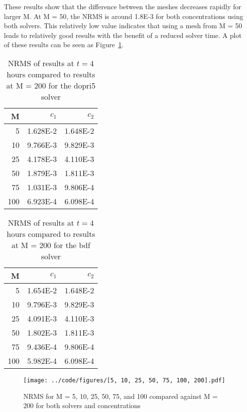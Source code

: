 \documentclass[twocolumn,10pt]{asme2ej}
\begin{document}
These results show that the difference between the meshes decreases rapidly for larger M. At M = 50, the NRMS is around 1.8E-3 for both concentrations using both solvers. This relatively low value indicates that using a mesh from M = 50 leads to relatively good results with the benefit of a reduced solver time. A plot of these results can be seen as Figure~\ref{NRMS_plot}.


\begin{table}[tb]
\begin{center}
\begin{tabular}{| r | r r |}
\hline
M & $c_{1}$ & $c_{2}$ \\
\hline
  5 & 1.628E-2 & 1.648E-2 \\
 10 & 9.766E-3 & 9.829E-3 \\
 25 & 4.178E-3 & 4.110E-3 \\
 50 & 1.879E-3 & 1.811E-3 \\
 75 & 1.031E-3 & 9.806E-4 \\
100 & 6.923E-4 & 6.098E-4 \\
\hline
\end{tabular}
\caption{NRMS of results at $t=4$ hours compared to results at M = 200 for the dopri5 solver}
\label{dopri5_nrms_table}
\end{center}
\end{table}

\begin{table}[tb]
\begin{center}
\begin{tabular}{| r | r r |}
\hline
M & $c_{1}$ & $c_{2}$ \\
\hline
  5 & 1.654E-2 & 1.648E-2 \\
 10 & 9.796E-3 & 9.829E-3 \\
 25 & 4.091E-3 & 4.110E-3 \\
 50 & 1.802E-3 & 1.811E-3 \\
 75 & 9.436E-4 & 9.806E-4 \\
100 & 5.982E-4 & 6.098E-4 \\
\hline
\end{tabular}
\caption{NRMS of results at $t=4$ hours compared to results at M = 200 for the bdf solver}
\label{bdf_nrms_table}
\end{center}
\end{table}

\begin{figure}[tb]
\begin{center}
\texttt{[image: ../code/figures/[5, 10, 25, 50, 75, 100, 200].pdf]}
\caption{NRMS for M = 5, 10, 25, 50, 75, and 100 compared against M = 200 for both solvers and concentrations}
\label{NRMS_plot}
\end{center}
\end{figure}
\end{document}
